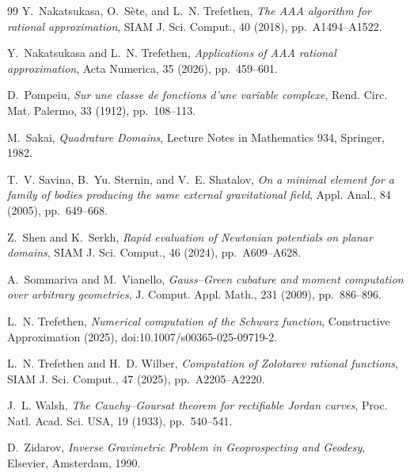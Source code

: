 \documentclass[onefignum,onetabnum]{siamart220329}
\begin{document}
\begin{thebibliography}{99}
Y.~Nakatsukasa, O.~S\`ete, and L.~N. Trefethen,
\emph{The AAA algorithm for rational approximation}, SIAM J. Sci.
Comput., 40 (2018), pp.~A1494--A1522.

Y.~Nakatsukasa and L.~N. Trefethen,
\emph{Applications of AAA rational approximation},
Acta Numerica, 35 (2026), pp.~459--601.

D.~Pompeiu,
\emph{Sur une classe de fonctions d'une variable complexe},
Rend. Circ. Mat. Palermo, 33 (1912), pp.~108--113.

M.~Sakai,
\emph{Quadrature Domains}, Lecture Notes in Mathematics 934,
Springer, 1982.

T.~V. Savina, B.~Yu. Sternin, and V.~E. Shatalov,
\emph{On a minimal element for a family of bodies producing the same
external gravitational field}, Appl. Anal., 84 (2005), pp.~649--668.

Z.~Shen and K.~Serkh,
\emph{Rapid evaluation of Newtonian potentials on planar domains},
SIAM J. Sci. Comput., 46 (2024), pp.~A609--A628.

A.~Sommariva and M.~Vianello,
\emph{Gauss--Green cubature and moment computation over arbitrary
geometries}, J. Comput. Appl. Math., 231 (2009), pp.~886--896.

L.~N. Trefethen,
\emph{Numerical computation of the Schwarz function},
Constructive Approximation (2025), doi:10.1007/s00365-025-09719-2.

L.~N. Trefethen and H.~D. Wilber,
\emph{Computation of Zolotarev rational functions}, SIAM J. Sci.
Comput., 47 (2025), pp.~A2205--A2220.

J.~L. Walsh,
\emph{The Cauchy--Goursat theorem for rectifiable Jordan curves},
Proc. Natl. Acad. Sci. USA, 19 (1933), pp.~540--541.

D.~Zidarov,
\emph{Inverse Gravimetric Problem in Geoprospecting and Geodesy},
Elsevier, Amsterdam, 1990.

\end{thebibliography}
\end{document}
